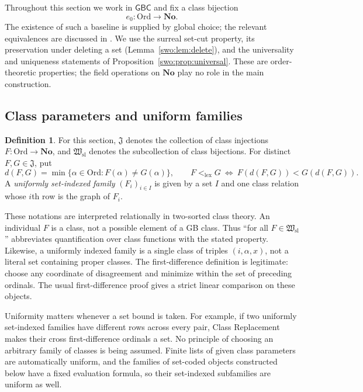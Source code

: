 \documentclass[11pt]{article}
\theoremstyle{definition}
\newtheorem{definition}[definition]{Definition}
\theoremstyle{remark}
\newcommand{\No}{\mathbf{No}}
\newcommand{\Ord}{\mathrm{Ord}}
\newcommand{\Hsl}{\mathfrak W_{\mathrm{sl}}}
\newcommand{\Jinj}{\mathfrak J}
\newcommand{\lex}{\mathrm{lex}}
\newcommand{\GBC}{\mathsf{GBC}}
\begin{document}
Throughout this section we work in $\GBC$ and fix a class bijection
\[
 e_0:\Ord\longrightarrow\No.
\]
The existence of such a baseline is supplied by global choice; the relevant
equivalences are discussed in \cite{HamkinsGC}.  We use the surreal
set-cut property, its preservation under deleting a set
(Lemma~\ref{swo:lem:delete}), and the universality and uniqueness statements of
Proposition~\ref{swo:prop:universal}.  These are order-theoretic properties; the
field operations on $\No$ play no role in the main construction.

\subsection{Class parameters and uniform families}

\begin{definition}\label{swo:gl:uniform}
For this section, $\Jinj$ denotes the collection of class injections
$F:\Ord\to\No$, and $\Hsl$ denotes the subcollection of class bijections.
For distinct $F,G\in\Jinj$, put
\[
 d(F,G)=\min\{\alpha\in\Ord:F(\alpha)\ne G(\alpha)\},
 \qquad
 F<_{\lex}G\ \Longleftrightarrow\ F(d(F,G))<G(d(F,G)).
\]
A \emph{uniformly set-indexed family} $(F_i)_{i\in I}$ is given by a set $I$
and one class relation whose $i$th row is the graph of $F_i$.
\end{definition}

These notations are interpreted relationally in two-sorted class theory.
An individual $F$ is a class, not a possible element of a GB class.  Thus
``for all $F\in\Hsl$'' abbreviates quantification over class functions with the
stated property.  Likewise, a uniformly indexed family is a single class
of triples $(i,\alpha,x)$, not a literal set containing proper classes.
The first-difference definition is legitimate: choose any coordinate of
disagreement and minimize within the set of preceding ordinals.  The usual
first-difference proof gives a strict linear comparison on these objects.

Uniformity matters whenever a set bound is taken.  For example, if two
uniformly set-indexed families have different rows across every pair, Class
Replacement makes their cross first-difference ordinals a set.  No principle
of choosing an arbitrary family of classes is being assumed.  Finite lists of
given class parameters are automatically uniform, and the families of
set-coded objects constructed below have a fixed evaluation formula, so their
set-indexed subfamilies are uniform as well.
\end{document}
